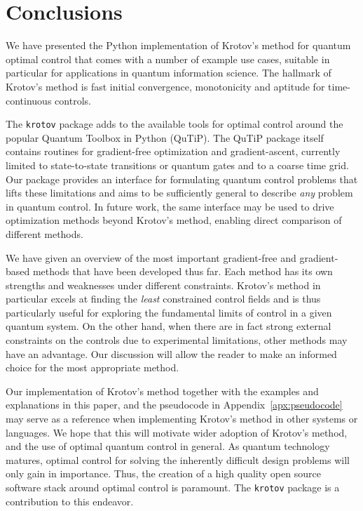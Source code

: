 \documentclass[submission, Phys]{SciPost}
\begin{document}
\section{Conclusions}
\label{sec:conclusions}

We have presented the Python implementation of Krotov's method for quantum
optimal control that comes with a number of example use cases, suitable in
particular for applications in quantum information science.
The hallmark of Krotov's method is fast initial convergence, monotonicity and
aptitude for time-continuous controls.

The \texttt{krotov} package adds to the available tools for optimal control
around the popular Quantum Toolbox in Python (QuTiP). The QuTiP package itself
contains routines for gradient-free optimization and gradient-ascent, currently
limited to state-to-state transitions or quantum gates and to a coarse time
grid.
Our package provides an interface for formulating quantum control problems that
lifts these limitations and aims to be sufficiently general to describe
\emph{any} problem in quantum control.
In future work, the same interface may be used to drive optimization methods
beyond Krotov's method, enabling direct comparison of different methods.

We have given an overview of the most important gradient-free and gradient-based
methods that have been developed thus far.
Each method has its own strengths and weaknesses under different constraints.
Krotov's method in particular excels at finding the \emph{least} constrained
control fields and is thus particularly useful for exploring the fundamental
limits of control in a given quantum system.
On the other hand, when there are in fact strong external constraints on the
controls due to experimental limitations, other methods may have an advantage.
Our discussion will allow the reader to make an informed choice for the most
appropriate method.

Our implementation of Krotov's method together with the examples and
explanations in this paper, and the pseudocode in Appendix~\ref{apx:pseudocode}
may serve as a reference when implementing Krotov's method in other systems or
languages.
We hope that this will motivate wider adoption of Krotov's method, and the use
of optimal quantum control in general.
As quantum technology matures, optimal control for solving the inherently
difficult design problems will only gain in importance.
Thus, the creation of a high quality open source software stack around optimal
control is paramount.
The \texttt{krotov} package is a contribution to this endeavor.
\end{document}

